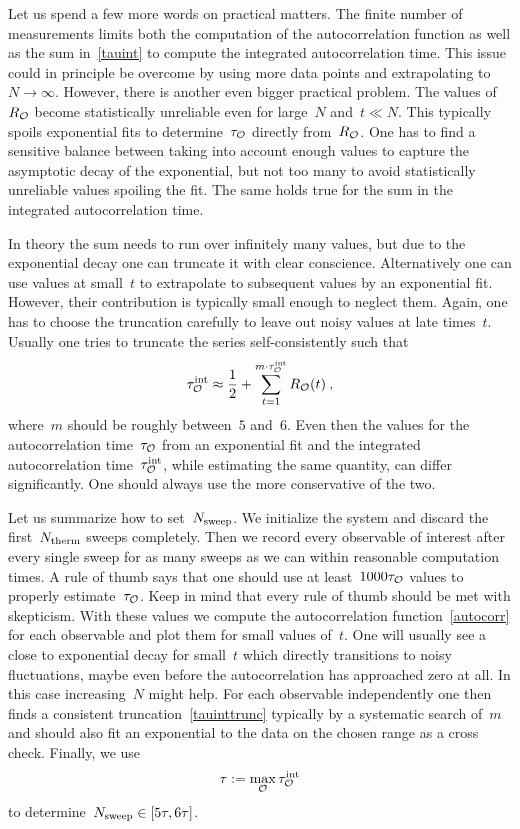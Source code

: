 Let us spend a few more words on practical matters. The finite number of
measurements limits both the computation of the autocorrelation function as well
as the sum in~\eqref{tauint} to compute the integrated autocorrelation time.
This issue could in principle be overcome by using more data points and
extrapolating to~$N\to \infty$. However, there is another even bigger practical
problem. The values of~$R_{\mathcal{O}}$ become statistically unreliable even for
large~$N$ and~$t\ll N$. This typically spoils exponential fits to
determine~$\tau_{\mathcal{O}}$ directly from~$R_{\mathcal{O}}$. One has to find a sensitive
balance between taking into account enough values to capture the asymptotic
decay of the exponential, but not too many to avoid statistically unreliable
values spoiling the fit. The same holds true for the sum in the integrated
autocorrelation time.

In theory the sum needs to run over infinitely many values, but due to the
exponential decay one can truncate it with clear conscience. Alternatively one
can use values at small~$t$ to extrapolate to subsequent values by an
exponential fit. However, their contribution is typically small enough to
neglect them. Again, one has to choose the truncation carefully to leave out
noisy values at late times~$t$. Usually one tries to truncate the series
self-consistently such that
%
\begin{equation}\label{tauinttrunc}
  \tau^{\mathrm{int}}_{\mathcal{O}} \approx
    \frac{1}{2} + \sum_{t=1}^{m \cdot \tau^{\mathrm{int}}_{\mathcal{O}}} R_{\mathcal{O}}(t)\:,
\end{equation}
%
where~$m$ should be roughly between~$5$ and~$6$. Even then the values for the
autocorrelation time~$\tau_{\mathcal{O}}$ from an exponential fit and the integrated
autocorrelation time~$\tau^{\mathrm{int}}_{\mathcal{O}}$, while estimating the same quantity, can
differ significantly. One should always use the more conservative of the two.

Let us summarize how to set~$N_{\mathrm{sweep}}$. We initialize the system and discard the
first~$N_{\mathrm{therm}}$ sweeps completely. Then we record every observable of interest
after every single sweep for as many sweeps as we can within reasonable
computation times. A rule of thumb says that one should use at least~$1000
\tau_{\mathcal{O}}$ values to properly estimate~$\tau_{\mathcal{O}}$. Keep in mind that every
rule of thumb should be met with skepticism. With these values we compute the
autocorrelation function~\eqref{autocorr} for each observable and plot them for
small values of~$t$. One will usually see a close to exponential decay for
small~$t$ which directly transitions to noisy fluctuations, maybe even
before the autocorrelation has approached zero at all. In this case
increasing~$N$ might help. For each observable independently one then finds a
consistent truncation~\eqref{tauinttrunc} typically by a systematic search
of~$m$ and should also fit an exponential to the data on the chosen range as a
cross check. Finally, we use
%
\begin{equation}
  \tau := \max_{\mathcal{O}} \tau^{\mathrm{int}}_{\mathcal{O}}
\end{equation}
%
to determine~$N_{\mathrm{sweep}} \in [5 \tau, 6 \tau]$.

